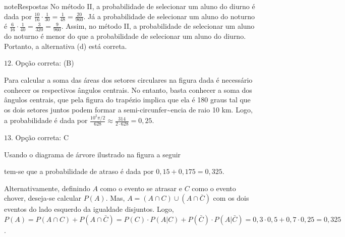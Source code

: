 \begin{sphinxadmonition}{note}{Respostas}
No método II, a probabilidade de selecionar um aluno do diurno é dada por \(\frac{10}{16}\cdot\frac{1}{30}=\frac{1}{48}=\frac{20}{960}\). Já a probabilidade de selecionar um aluno do noturno é \(\frac{6}{16}\cdot \frac{1}{40}=\frac{3}{320}=\frac{9}{960}\). Assim, no método II, a probabilidade de selecionar um aluno do noturno é menor do que a probabilidade de selecionar um aluno do diurno. Portanto, a alternativa (d) está correta.

\(12.\) Opção correta: (B)

Para calcular a soma das áreas dos setores circulares na figura dada é necessário conhecer os respectivos ângulos centrais. No entanto, basta conhecer a soma dos ângulos centrais, que pela figura do trapézio implica que ela é 180 graus tal que os dois setores juntos podem formar a semi-circunfer\textasciitilde{}encia de raio 10 km. Logo, a probabilidade é dada por \(\frac{10^2\pi/2}{628}\approx \frac{314}{2\cdot 628} =0,25.\)

\(13.\) Opção correta: C

Usando o diagrama de árvore ilustrado na figura a seguir
\begin{center}\end{center}
tem-se que a probabilidade de atraso é dada por \(0,15+0,175=0,325.\)

Alternativamente, definindo \(A\) como o evento se atrasar e \(C\) como o evento chover, deseja-se calcular \(P(A)\). Mas, \(A=(A\cap C) \cup (A\cap \bar{C})\) com os dois eventos do lado esquerdo da igualdade disjuntos. Logo, \(P(A)=P(A\cap C)+P(A\cap \bar{C})=P(C)\cdot P(A|C)+P(\bar{C})\cdot P(A|\bar{C})=0,3\cdot 0,5+0,7\cdot 0,25=0,325\).


\end{sphinxadmonition}
